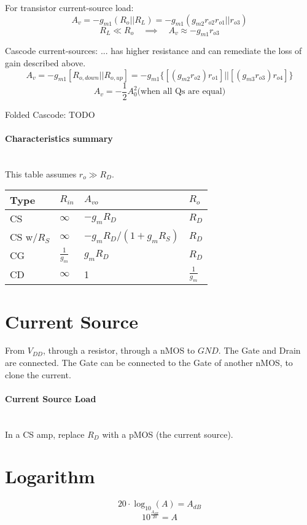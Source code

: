 \documentclass[twocolumn]{article}
\begin{document}
      For transistor current-source load:
      $$A_v = -g_{m1} (R_o || R_L) = -g_{m1} (g_{m2}r_{o2}r_{o1} || r_{o3})$$
      $$R_L \ll R_o \quad\implies\quad A_v \approx -g_{m1}r_{o3}$$

      Cascode current-sources:
      ... has higher resistance and can remediate the loss of gain
      described above.
      $$A_v = -g_{m1}[R_{o,down} || R_{o,up}]
        = -g_{m1} \{ [(g_{m2}r_{o2})r_{o1}] || [(g_{m3}r_{o3})r_{o4}] \}
        $$
      $$A_v = -\frac{1}{2} A_0^2 \text{(when all Qs are equal)}$$

      Folded Cascode:
        TODO

    \paragraph{Characteristics summary} \hfill \\
      This table assumes $r_o \gg R_D$.
      \begin{tabular}{|l|l|l|l|}
        \hline
        Type       & $R_{in}$        & $A_{vo}$                 & $R_o$ \\
        \hline
        CS         & $\infty$        & $-g_m R_D$               & $R_D$ \\
        CS w/$R_S$ & $\infty$        & $-g_mR_D / (1 + g_mR_S)$ & $R_D$ \\
        CG         & $\frac{1}{g_m}$ & $g_m R_D$                & $R_D$ \\
        CD         & $\infty$        & 1                   & $\frac{1}{g_m}$ \\
        \hline
      \end{tabular}

  \section{Current Source}
    From $V_{DD}$, through a resistor, through a nMOS to $GND$.
    The Gate and Drain are connected.
    The Gate can be connected to the Gate of another nMOS, to clone the current.

    \paragraph{Current Source Load} \hfill \\
      In a CS amp, replace $R_D$ with a pMOS (the current source).

  \section{Logarithm}
    $$20 \cdot \log_{10}(A) = A_{dB}$$
    $$10^{\frac{A_{dB}}{20}} = A$$
\end{document}

